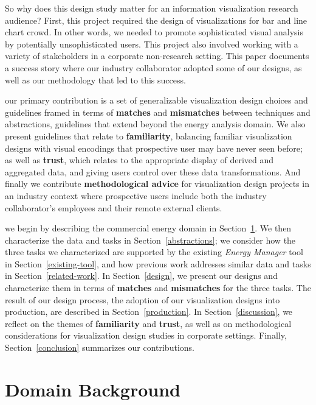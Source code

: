 \documentclass[journal]{vgtc}                %
\newcommand{\bstart}[1]{\vspace{1mm} \noindent{\textbf{#1:}}}
\begin{document}
So why does this design study matter for an information visualization research audience?
First, this project required the design of visualizations for bar and line chart crowd. 
In other words, we needed to promote sophisticated visual analysis by potentially unsophisticated users.
This project also involved working with a variety of stakeholders in a corporate non-research setting. 
This paper documents a success story where our industry collaborator adopted some of our designs, as well as our methodology that led to this success.

\bstart{Contributions} our primary contribution is a set of generalizable visualization design choices and guidelines framed in terms of {\bf matches} and {\bf mismatches} between techniques and abstractions, guidelines that extend beyond the energy analysis domain.
We also present guidelines that relate to {\bf familiarity}, balancing familiar visualization designs with visual encodings that prospective user may have never seen before; as well as {\bf trust}, which relates to the appropriate display of derived and aggregated data, and giving users control over these data transformations.
And finally we contribute {\bf methodological advice} for visualization design projects in an industry context where prospective users include both the industry collaborator's employees and their remote external clients.

\bstart{Outline} we begin by describing the commercial energy domain in Section~\ref{domain}.
We then characterize the data and tasks in Section~\ref{abstractions}; we consider how the three tasks we characterized are supported by the existing {\it Energy Manager} tool in Section~\ref{existing-tool}, and how previous work addresses similar data and tasks in Section~\ref{related-work}.
In Section~\ref{design}, we present our designs and characterize them in terms of {\bf matches} and {\bf mismatches} for the three tasks.
The result of our design process, the adoption of our visualization designs into production, are described in Section~\ref{production}.
In Section~\ref{discussion}, we reflect on the themes of {\bf familiarity} and {\bf trust}, as well as on methodological considerations for visualization design studies in corporate settings.
Finally, Section~\ref{conclusion} summarizes our contributions.


\section{Domain Background}
\label{domain}
\end{document}

